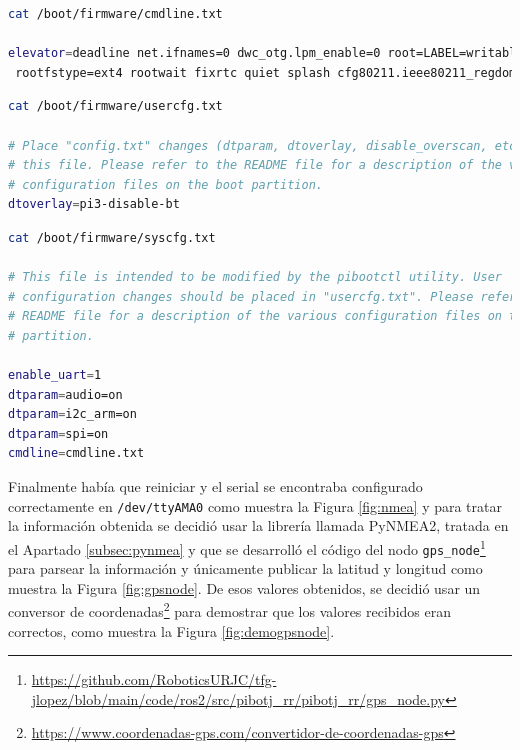 \begin{lstlisting}[language=bash]
cat /boot/firmware/cmdline.txt 

elevator=deadline net.ifnames=0 dwc_otg.lpm_enable=0 root=LABEL=writable \
 rootfstype=ext4 rootwait fixrtc quiet splash cfg80211.ieee80211_regdom=GB
\end{lstlisting}

\begin{lstlisting}[language=bash]
cat /boot/firmware/usercfg.txt 
	
# Place "config.txt" changes (dtparam, dtoverlay, disable_overscan, etc.) in
# this file. Please refer to the README file for a description of the various
# configuration files on the boot partition.
dtoverlay=pi3-disable-bt
\end{lstlisting}

\begin{lstlisting}[language=bash]
 cat /boot/firmware/syscfg.txt 
 
# This file is intended to be modified by the pibootctl utility. User
# configuration changes should be placed in "usercfg.txt". Please refer to the
# README file for a description of the various configuration files on the boot
# partition.

enable_uart=1
dtparam=audio=on
dtparam=i2c_arm=on
dtparam=spi=on
cmdline=cmdline.txt	
\end{lstlisting}


Finalmente había que reiniciar y el serial se encontraba configurado correctamente en \verb|/dev/ttyAMA0| como muestra la Figura \ref{fig:nmea} y para tratar la información obtenida se decidió usar la librería llamada PyNMEA2, tratada en el Apartado \ref{subsec:pynmea} y que se desarrolló el código del nodo \verb|gps_node|\footnote{\url{https://github.com/RoboticsURJC/tfg-jlopez/blob/main/code/ros2/src/pibotj_rr/pibotj_rr/gps_node.py}} para parsear la información y únicamente publicar la latitud y longitud como muestra la Figura \ref{fig:gpsnode}. De esos valores obtenidos, se decidió usar un conversor de coordenadas\footnote{\url{https://www.coordenadas-gps.com/convertidor-de-coordenadas-gps}} para demostrar que los valores recibidos eran correctos, como muestra la Figura \ref{fig:demogpsnode}.


